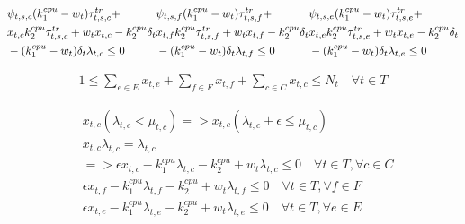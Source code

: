\documentclass[conference]{IEEEtran}
\begin{document}
    \begin{subequations}
      \begin{align}
        &\notag\psi_{t,s,c}(k_1^{cpu}-w_t)\tau^{tr}_{t,s,c} + \\ &\notag x_{t,c}k_2^{cpu}\tau_{t,s,c}^{tr}+w_t x_{t,c}-k_2^{cpu}\delta_t \\ &-(k_1^{cpu}-w_t)\delta_t\lambda_{t,c} \le 0
      \end{align}
      \begin{align}
        &\notag\psi_{t,s,f}(k_1^{cpu}-w_t)\tau^{tr}_{t,s,f} + \\ &\notag x_{t,f}k_2^{cpu}\tau_{t,s,f}^{tr}+w_t x_{t,f}-k_2^{cpu}\delta_t \\ &-(k_1^{cpu}-w_t)\delta_t\lambda_{t,f} \le 0
      \end{align}
      \begin{align}
        &\notag\psi_{t,s,e}(k_1^{cpu}-w_t)\tau^{tr}_{t,s,e} + \\ &\notag x_{t,e}k_2^{cpu}\tau_{t,s,e}^{tr}+w_t x_{t,e}-k_2^{cpu}\delta_t \\ &-(k_1^{cpu}-w_t)\delta_t\lambda_{t,e} \le 0
      \end{align}
    \end{subequations}

    \begin{subequations}
      \begin{align}
        1 \le \sum_{e \in E}x_{t,e} + \sum_{f \in F}x_{t,f} + \sum_{c \in C}x_{t,c} \le N_t \quad \forall{t \in T}
      \end{align}
    \end{subequations}

    \begin{subequations}
      \begin{align}
        &x_{t,c}(\lambda_{t,c} < \mu_{t,c}) => x_{t,c}(\lambda_{t,c} + \epsilon \le \mu_{t,c}) \\
        &x_{t,c}\lambda_{t,c} = \lambda_{t,c} \\
        &=> \epsilon x_{t,c} - k_1^{cpu}\lambda_{t,c} - k_2^{cpu} + w_t\lambda_{t,c} \le 0 \quad \forall{t \in T}, \forall{c \in C} \\
        &\epsilon x_{t,f} - k_1^{cpu}\lambda_{t,f} - k_2^{cpu} + w_t\lambda_{t,f} \le 0 \quad \forall{t \in T}, \forall{f \in F} \\
        &\epsilon x_{t,e} - k_1^{cpu}\lambda_{t,e} - k_2^{cpu} + w_t\lambda_{t,e} \le 0 \quad \forall{t \in T}, \forall{e \in E}
      \end{align}
    \end{subequations}
\end{document}

